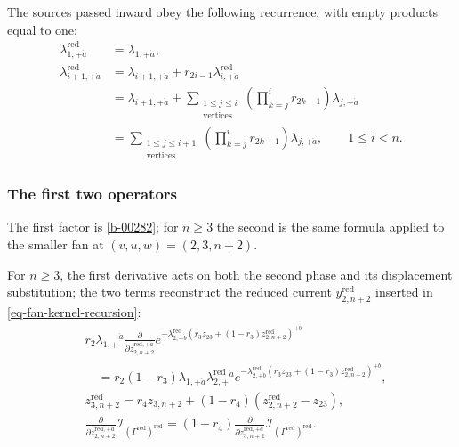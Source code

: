 \documentclass[11pt]{article}
\numberwithin{equation}{section}
\numberwithin{figure}{section}
\numberwithin{table}{section}
\begin{document}
The sources passed inward obey the following recurrence, with empty products equal to one:
\begin{equation}\label{eq-B-fan-first-cycle}
\begin{aligned}
\lambda_{1,+\dot a}^{\mathrm{red}}&=\lambda_{1,+\dot a},\\
\lambda_{i+1,+\dot a}^{\mathrm{red}}
&=\lambda_{i+1,+\dot a}+r_{2i-1}\lambda_{i,+\dot a}^{\mathrm{red}}\\
&=\lambda_{i+1,+\dot a}
+\sum_{\substack{1\le j\le i\\\mathrm{vertices}}}
\left(\prod_{k=j}^{i}r_{2k-1}\right)\lambda_{j,+\dot a}\\
&=\sum_{\substack{1\le j\le i+1\\\mathrm{vertices}}}
\left(\prod_{k=j}^{i}r_{2k-1}\right)\lambda_{j,+\dot a},
\qquad 1\le i<n.
\end{aligned}
\end{equation}

\subsubsection{The first two operators}\label{local-B4-first-two-heading}

The first factor is \eqref{b-00282}; for $n\ge3$ the second is the same formula applied to the smaller fan at $(v,u,w)=(2,3,n+2)$.

For $n\ge3$, the first derivative acts on both the second phase and its displacement substitution; the two terms reconstruct the reduced current $y_{2,n+2}^{\mathrm{red}}$ inserted in \eqref{eq-fan-kernel-recursion}:
\begin{equation}\label{eq-B-fan-second-fractions}
\begin{aligned}
&r_2\lambda_{1,+}{}^{\dot a}
\frac{\partial}{\partial z_{2,n+2}^{\mathrm{red},+\dot a}}
e^{-\lambda_{2,+\dot b}^{\mathrm{red}}
(r_3z_{23}+(1-r_3)z_{2,n+2}^{\mathrm{red}})^{+\dot b}}\\
&\quad=r_2(1-r_3)
\lambda_{1,+\dot a}\lambda_{2,+}^{\mathrm{red}}{}^{\dot a}
e^{-\lambda_{2,+\dot b}^{\mathrm{red}}
(r_3z_{23}+(1-r_3)z_{2,n+2}^{\mathrm{red}})^{+\dot b}},\\[3pt]
&z_{3,n+2}^{\mathrm{red}}
=r_4z_{3,n+2}+(1-r_4)(z_{2,n+2}^{\mathrm{red}}-z_{23}),\\
&\frac{\partial}{\partial z_{2,n+2}^{\mathrm{red},+\dot a}}
\mathcal I_{(\Gamma^{\mathrm{red}})^{\mathrm{red}}}
= (1-r_4)\frac{\partial}{\partial z_{3,n+2}^{\mathrm{red},+\dot a}}
\mathcal I_{(\Gamma^{\mathrm{red}})^{\mathrm{red}}}.
\end{aligned}
\end{equation}
\end{document}
